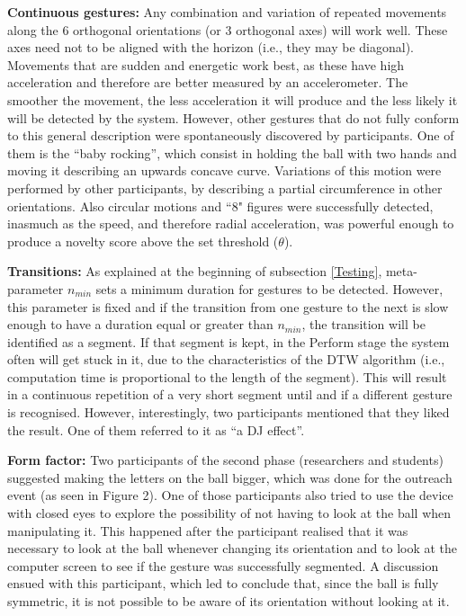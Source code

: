\documentclass{nime-alternate_MANUSCRIPT} %
\begin{document}
\textbf{Continuous gestures:} Any combination and variation of repeated movements along the 6 orthogonal orientations (or 3 orthogonal axes) will work well. These axes need not to be aligned with the horizon (i.e., they may be diagonal).  Movements that are sudden and energetic work best, as these have high acceleration and therefore are better measured by an accelerometer. The smoother the movement, the less acceleration it will produce and the less likely it will be detected by the system. However, other gestures that do not fully conform to this general description were spontaneously discovered by participants. One of them is the “baby rocking”, which consist in holding the ball with two hands and moving it describing an upwards concave curve. Variations of this motion were performed by other participants, by describing a partial circumference in other orientations. Also circular motions and ``8" figures were successfully detected, inasmuch as the speed, and therefore radial acceleration, was powerful enough to produce a novelty score above the set threshold ($\theta $).

\textbf{Transitions:} As explained at the beginning of subsection \ref{Testing}, meta-parameter $n_{min}$ sets a minimum duration for gestures to be detected. However, this parameter is fixed and if the transition from one gesture to the next is slow enough to have a duration equal or greater than $n_{min}$, the transition will be identified as a segment. If that segment is kept, in the Perform stage the system often will get stuck in it, due to the characteristics of the DTW algorithm (i.e., computation time is proportional to the length of the segment). This will result in a continuous repetition of a very short segment until and if a different gesture is recognised. However, interestingly, two participants mentioned that they liked the result. One of them referred to it as “a DJ effect”.

\textbf{Form factor:} Two participants of the second phase (researchers and students) suggested making the letters on the ball bigger, which was done for the outreach event (as seen in Figure 2). One of those participants also tried to use the device with closed eyes to explore the possibility of not having to look at the ball when manipulating it. This happened after the participant realised that it was necessary to look at the ball whenever changing its orientation and to look at the computer screen to see if the gesture was successfully segmented. A discussion ensued with this participant, which led to conclude that, since the ball is fully symmetric, it is not possible to be aware of its orientation without looking at it.
\end{document}
